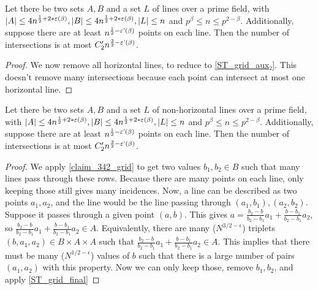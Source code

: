 \begin{theorem}
    \label{ST_grid_aux}
    \leanok
    Let there be two sets $A, B$ and a set $L$ of lines over a prime field, 
    with $|A| \leq 4n^{\frac12 + 2*\operatorname{\varepsilon}(\beta)}, |B| \leq 4n^{\frac12 + 2*\operatorname{\varepsilon}(\beta)}, |L| \leq n$ and $p^\beta \leq n \leq p^{2 - \beta}$.
    Additionally, suppose there are at least $n^{\frac12 - \operatorname{\varepsilon'}(\beta)}$ points on each line.
    Then the number of intersections is at most $C'_2 n^{\frac32 - \operatorname{\varepsilon'}(\beta)}$.
\end{theorem}

\begin{proof}
    \leanok
    We now remove all horizontal lines, to reduce to \ref{ST_grid_aux₂}.
    This doesn't remove many intersections because each point can intersect at most one horizontal line.
\end{proof}

\begin{theorem}
    \label{ST_grid_aux₂}
    \leanok
    Let there be two sets $A, B$ and a set $L$ of non-horizontal lines over a prime field, 
    with $|A| \leq 4n^{\frac12 + 2*\operatorname{\varepsilon}(\beta)}, |B| \leq 4n^{\frac12 + 2*\operatorname{\varepsilon}(\beta)}, |L| \leq n$ and $p^\beta \leq n \leq p^{2 - \beta}$.
    Additionally, suppose there are at least $n^{\frac12 - \operatorname{\varepsilon'}(\beta)}$ points on each line.
    Then the number of intersections is at most $C'_2 n^{\frac32 - \operatorname{\varepsilon'}(\beta)}$.
\end{theorem}

\begin{proof}
    \leanok
    We apply \ref{claim_342_grid} to get two values $b_1, b_2 \in B$ such that many lines pass
    through these rows. Because there are many points on each line, only keeping those still gives many
    incidences. Now, a line can be described as two points $a_1, a_2$, and the line would be the line passing through
    $(a_1, b_1), (a_2, b_2)$. Suppose it passes through a given point $(a, b)$. This gives
    $a = \frac{b_2 - b}{b_2 - b_1} a_1 + \frac{b - b_1}{b_2 - b_1} a_2$, so
    $\frac{b_2 - b}{b_2 - b_1} a_1 + \frac{b - b_1}{b_2 - b_1} a_2 \in A$. Equivalently, there are many ($N^{3/2 - \epsilon}$) triplets
    $(b, a_1, a_2) \in B \times A \times A$ such that $\frac{b_2 - b}{b_2 - b_1} a_1 + \frac{b - b_1}{b_2 - b_1} a_2 \in A$.
    This implies that there must be many ($N^{1/2 - \epsilon}$) values of $b$ such that there is a large number of pairs
    $(a_1, a_2)$ with this property. Now we can only keep those, remove $b_1, b_2$, and apply \ref{ST_grid_final}
\end{proof}

